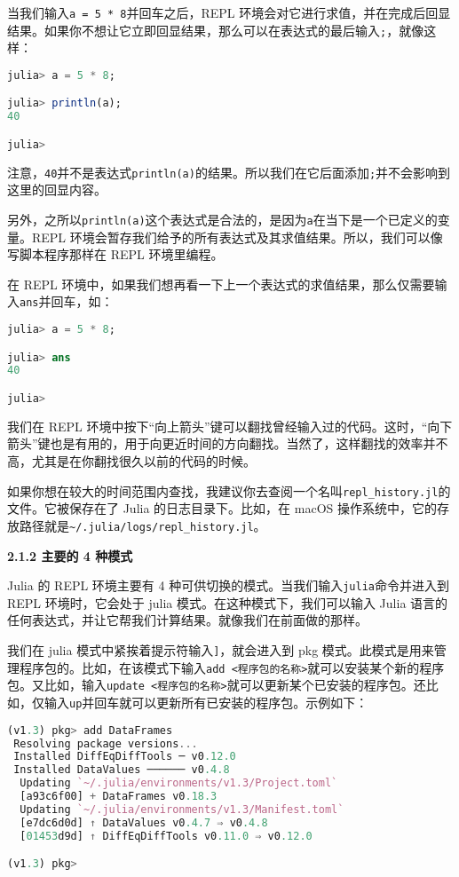 当我们输入\verb|a = 5 * 8|并回车之后，REPL 环境会对它进行求值，并在完成后回显结果。如果你不想让它立即回显结果，那么可以在表达式的最后输入\verb|;|，就像这样：

\begin{lstlisting}[language=julia]
julia> a = 5 * 8;

julia> println(a);
40

julia> 
\end{lstlisting}

注意，\verb|40|并不是表达式\verb|println(a)|的结果。所以我们在它后面添加\verb|;|并不会影响到这里的回显内容。

另外，之所以\verb|println(a)|这个表达式是合法的，是因为\verb|a|在当下是一个已定义的变量。REPL 环境会暂存我们给予的所有表达式及其求值结果。所以，我们可以像写脚本程序那样在 REPL 环境里编程。

在 REPL 环境中，如果我们想再看一下上一个表达式的求值结果，那么仅需要输入\verb|ans|并回车，如：

\begin{lstlisting}[language=julia]
julia> a = 5 * 8;

julia> ans
40

julia> 
\end{lstlisting}

我们在 REPL 环境中按下“向上箭头”键可以翻找曾经输入过的代码。这时，“向下箭头”键也是有用的，用于向更近时间的方向翻找。当然了，这样翻找的效率并不高，尤其是在你翻找很久以前的代码的时候。

如果你想在较大的时间范围内查找，我建议你去查阅一个名叫\verb|repl_history.jl|的文件。它被保存在了 Julia 的日志目录下。比如，在 macOS 操作系统中，它的存放路径就是\verb|~/.julia/logs/repl_history.jl|。

\textbf{2.1.2 主要的 4 种模式}

Julia 的 REPL 环境主要有 4 种可供切换的模式。当我们输入\verb|julia|命令并进入到 REPL 环境时，它会处于 julia 模式。在这种模式下，我们可以输入 Julia 语言的任何表达式，并让它帮我们计算结果。就像我们在前面做的那样。

我们在 julia 模式中紧挨着提示符输入\verb|]|，就会进入到 pkg 模式。此模式是用来管理程序包的。比如，在该模式下输入\verb|add <程序包的名称>|就可以安装某个新的程序包。又比如，输入\verb|update <程序包的名称>|就可以更新某个已安装的程序包。还比如，仅输入\verb|up|并回车就可以更新所有已安装的程序包。示例如下：

\begin{lstlisting}[language=julia]
(v1.3) pkg> add DataFrames
 Resolving package versions...
 Installed DiffEqDiffTools ─ v0.12.0
 Installed DataValues ────── v0.4.8
  Updating `~/.julia/environments/v1.3/Project.toml`
  [a93c6f00] + DataFrames v0.18.3
  Updating `~/.julia/environments/v1.3/Manifest.toml`
  [e7dc6d0d] ↑ DataValues v0.4.7 ⇒ v0.4.8
  [01453d9d] ↑ DiffEqDiffTools v0.11.0 ⇒ v0.12.0

(v1.3) pkg> 
\end{lstlisting}

